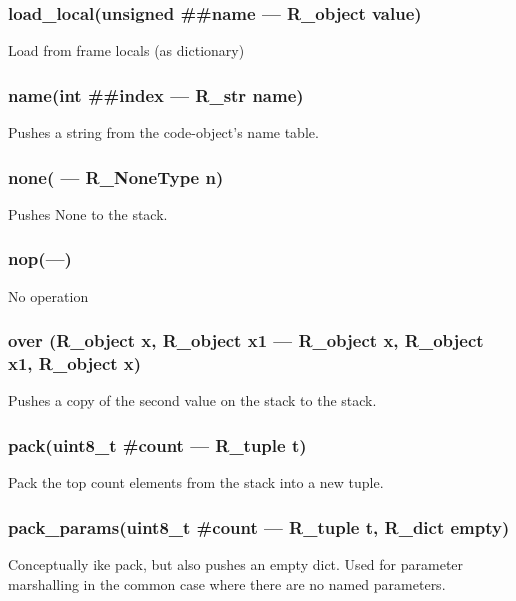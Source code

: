 \subsubsection{load\_local(unsigned \#\#name --- R\_object value) }
\vspace{-1em}Load from frame locals (as dictionary) \vspace{-1em}
\subsubsection{name(int \#\#index --- R\_str name)}
\vspace{-1em}Pushes a string from the code-object's name table. \vspace{-1em}
\subsubsection{none( --- R\_NoneType n)}
\vspace{-1em}Pushes None to the stack. \vspace{-1em}
\subsubsection{nop(---)}
\vspace{-1em}No operation \vspace{-1em}
\subsubsection{over (R\_object x, R\_object x1 --- R\_object x, R\_object x1, R\_object x)}
\vspace{-1em}Pushes a copy of the second value on the stack to the stack. \vspace{-1em}
\subsubsection{pack(uint8\_t \#count --- R\_tuple t)}
\vspace{-1em}Pack the top count elements from the stack into a new tuple. \vspace{-1em}
\subsubsection{pack\_params(uint8\_t \#count --- R\_tuple t, R\_dict empty)}
\vspace{-1em}Conceptually ike pack, but also pushes an empty dict. Used for parameter marshalling in the common case where there are no named parameters. \vspace{-1em}
